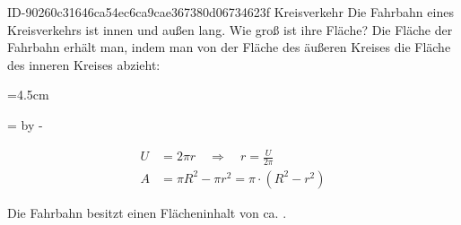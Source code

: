 \begin{exercise}
      {ID-90260c31646ca54ec6ca9cae367380d06734623f}
      {Kreisverkehr}
  \ifproblem\problem
    Die Fahrbahn eines Kreisverkehrs ist innen  und außen
     lang. Wie groß ist ihre Fläche?
  \fi
  \ifoutline\outline
    Die Fläche der Fahrbahn erhält man, indem man von der Fläche des
    äußeren Kreises die Fläche des inneren Kreises abzieht:\par
    \begingroup
      =4.5cm%
      \begin{minipage}{\dimen1}%
      \end{minipage}%
      =\linewidth%
      \advance{} by -%
      \begin{minipage}{\dimen2}%
        \setlength{\abovedisplayskip}{0pt}%
        \begin{equation*}
          \begin{split}
            U&=2\pi r
            \quad\Rightarrow\quad
            r=\frac{U}{2\pi}
            \\[2ex]
            A&=\pi R^2-\pi r^2
              =\pi\cdot\left(R^2-r^2\right)
          \end{split}
        \end{equation*}
      \end{minipage}%
    \endgroup
  \fi
  \ifoutcome\outcome
    Die Fahrbahn besitzt einen Flächeninhalt von ca. .
  \fi
\end{exercise}
